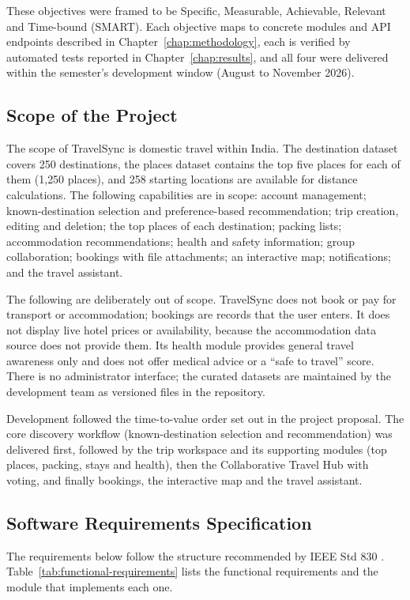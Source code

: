 These objectives were framed to be Specific, Measurable, Achievable, Relevant
and Time-bound (SMART). Each objective maps to concrete modules and API
endpoints described in Chapter~\ref{chap:methodology}, each is verified by
automated tests reported in Chapter~\ref{chap:results}, and all four were
delivered within the semester's development window (August to November
2026).

\subsection{Scope of the Project}

The scope of TravelSync is domestic travel within India. The destination
dataset covers 250 destinations, the places dataset contains the top five
places for each of them (1{,}250 places), and 258 starting locations are
available for distance calculations. The following capabilities are in
scope: account management; known-destination selection and preference-based
recommendation; trip creation, editing and deletion; the top places of each
destination; packing lists; accommodation recommendations; health and safety
information; group collaboration; bookings with file attachments; an
interactive map; notifications; and the travel assistant.

The following are deliberately out of scope. TravelSync does not book or pay
for transport or accommodation; bookings are records that the user enters.
It does not display live hotel prices or availability, because the
accommodation data source does not provide them. Its health module provides
general travel awareness only and does not offer medical advice or a
``safe to travel'' score. There is no administrator interface; the curated
datasets are maintained by the development team as versioned files in the
repository.

Development followed the time-to-value order set out in the project
proposal. The core discovery workflow (known-destination selection and
recommendation) was delivered first, followed by the trip workspace and its
supporting modules (top places, packing, stays and health), then the
Collaborative Travel Hub with voting, and finally bookings, the interactive
map and the travel assistant.

\subsection{Software Requirements Specification}

The requirements below follow the structure recommended by IEEE Std 830
\cite{ieee830}. Table~\ref{tab:functional-requirements} lists the functional
requirements and the module that implements each one.

